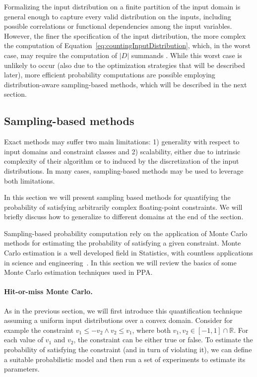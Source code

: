 Formalizing the input distribution on a finite partition of the input domain is general enough to capture every valid distribution on the inputs, including possible correlations or functional dependencies among the input variables. However, the finer the specification of the input distribution, the more complex the computation of Equation~\eqref{eq:countingInputDistribution}, which, in the worst case, may require the computation of $|D|$ summands \cite{Borges2014}. While this worst case is unlikely to occur (also due to the optimization strategies that will be described later), more efficient probability computations are possible employing distribution-aware sampling-based methods, which will be described in the next section.

\subsection{Sampling-based methods}\label{sec:computingprobabilitiesSampling}
Exact methods may suffer two main limitations: 1) generality with respect to input domains and constraint classes and 2) scalability, either due to intrinsic complexity of their algorithm or to induced by the discretization of the input distributions. In many cases, sampling-based methods may be used to leverage both limitations.

In this section we will present sampling based methods for quantifying the probability of satisfying arbitrarily complex floating-point constraints. We will briefly discuss how to generalize to different domains at the end of the section.

Sampling-based probability computation rely on the application of Monte Carlo methods for estimating the probability of satisfying a given constraint. Monte Carlo estimation is a well developed field in Statistics, with countless applications in science and engineering~\cite{Robert2005MCBook}. In this section we will review the basics of some Monte Carlo estimation techniques used in PPA. %

\paragraph{Hit-or-miss Monte Carlo.}

As in the previous section, we will first introduce this quantification technique assuming a uniform input distributions over a convex domain. Consider for example the constraint $v_1 \leq -v_2 \land v_2 \leq v_1$, where both $v_1, v_2 \in [-1, 1] \cap \mathbb{R}$. For each value of $v_1$ and $v_2$, the constraint can be either true or false. To estimate the probability of satisfying the constraint (and in turn of violating it), we can define a suitable probabilistic model and then run a set of experiments to estimate its parameters.


